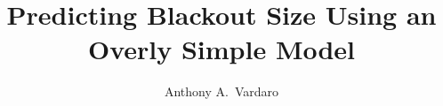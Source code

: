 \documentclass{urithesis}
\begin{document}
\title{Predicting Blackout Size Using an Overly Simple Model}

\author{Anthony A.~Vardaro}





\end{document}
